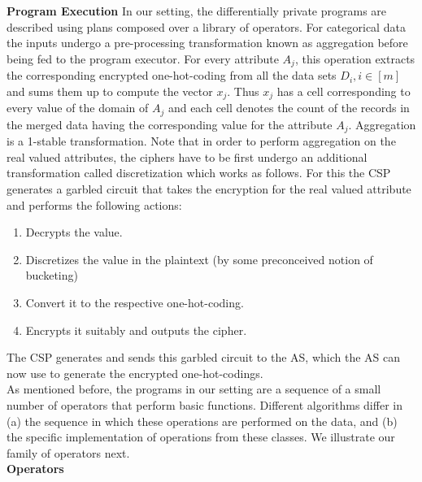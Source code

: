 \textbf{Program Execution}
In our setting, the differentially private programs are described using
plans composed over a library of operators. For categorical data the inputs undergo a pre-processing transformation known as aggregation before being fed to the program executor. For every attribute $A_j$, this operation extracts the corresponding encrypted one-hot-coding from all the data sets $D_i, i \in [m]$ and sums them up to compute the vector $x_j$. Thus $x_j$ has a cell corresponding to every value of the domain of $A_j$ and each cell denotes the count of the records in the merged data having the corresponding value for the attribute $A_j$.  Aggregation is a 1-stable transformation. Note that in order to perform aggregation on the real valued attributes, the ciphers have to be first undergo an additional transformation called discretization which works as follows. For this the CSP generates a garbled circuit that takes the encryption for the real valued attribute and performs the following actions:\begin{enumerate} 
\item Decrypts the value.
\item Discretizes the value in the plaintext (by some preconceived notion of bucketing)
\item Convert it to the respective one-hot-coding.
\item Encrypts it suitably and outputs the cipher.
\end{enumerate}
The CSP generates and sends this garbled circuit to the AS, which the AS can now use to generate the encrypted one-hot-codings.\\ As mentioned before, the programs in our setting are a sequence of a small number of operators that perform basic functions.
Different
algorithms differ in (a) the sequence in which these operations
are performed on the data, and (b) the specific implementation of
operations from these classes. We illustrate our family of operators next.  \\
\textbf{Operators}
